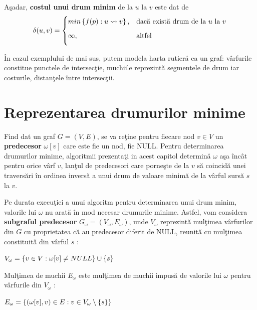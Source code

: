 \documentclass[11pt,a4paper]{report}
\begin{document}
    A\c sadar, \textbf{costul unui drum minim} de la $u$ la $v$ este dat de
  	\begin{equation*}
  		\delta(u,v)=
  		\begin{cases}
  	    min\left\{f(p):u\leadsto v\right\},&\text{dac\u a exist\u a drum de la $u$ la $v$} \medskip\\
  		\infty,& \text{altfel} \medskip
  		\end{cases}
  		\end{equation*}
  		
  	\^ In cazul exemplului de mai sus, putem modela harta rutier\u a ca un graf: v\^arfurile constitue punctele de intersec\c tie, muchiile reprezint\u a segmentele de drum iar costurile, distan\c tele \^ intre intersec\c tii.
  	
  	\section{Reprezentarea drumurilor minime}
  	
  	Find dat un graf $G=(V,E)$, se va re\c tine pentru fiecare nod $v\in V$ un \textbf{predecesor} $\omega[v]$ care este fie un nod, fie NULL. Pentru determinarea drumurilor minime, algoritmii prezenta\c ti in acest capitol determin\u a $\omega$ a\c sa \^ inc\^ at pentru orice v\^ arf $v$, lan\c tul de predecesori care porne\c ste de la $v$ s\u a coincid\u a unei travers\u ari \^ in ordinea invers\u a a unui drum de valoare minim\u a de la v\^ arful surs\u a $s$ la $v$.
  	
  	Pe durata execu\c tiei a unui algoritm pentru determinarea  unui drum minim, valorile lui $\omega$ nu arat\u a \^ in mod necesar drumurile minime. Astfel, vom considera \textbf{subgraful predecesor} $G_{\omega}=(V_{\omega},E_{\omega})$, unde $V_{\omega}$ reprezint\u a mul\c timea v\^ arfurilor din $G$ cu proprietatea c\u a au predecesor diferit de NULL, reunit\u a cu mul\c timea constituit\u a din v\^arful $s$ :
  	
  	\vspace{0.2cm}	
  	$\centering V_{\omega}=\left\{v\in V :\omega[v]\ne NULL\right\}\cup \left\{s\right\}$
  	\vspace{0.1cm}
  		
  	Mul\c timea de muchii $E_{\omega}$ este mul\c timea de muchii impus\u a de valorile lui $\omega$ pentru v\^ arfurile din $V_{\omega}$ :
  	
  	\vspace{0.2cm}
  	$\centering E_{\omega}=\left\{(\omega [v],v)\in E : v\in V_{\omega}\setminus \left\{s\right\}\right\}$
  	\vspace{0.2cm}
  	
\end{document}
